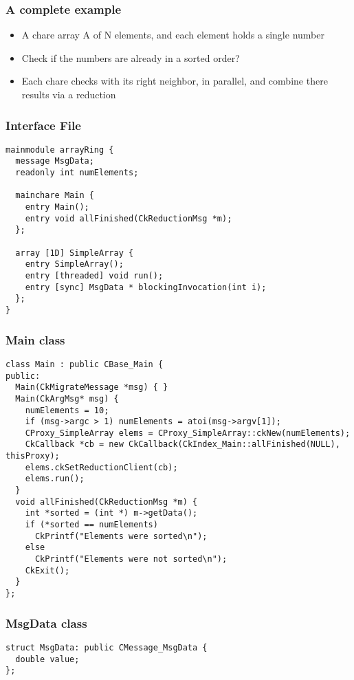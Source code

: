 \begin{frame}[fragile]
\frametitle{A complete example}
\begin{itemize}
\item A chare array A of N elements, and each element holds a single number
\item Check if the numbers are already in a sorted order? 
\item Each chare checks with its right neighbor, in parallel, and combine there
  results via a reduction
\end{itemize}
\end{frame}

\begin{frame}[fragile]
\frametitle{Interface File}
\begin{lstlisting}
mainmodule arrayRing {
  message MsgData;
  readonly int numElements;

  mainchare Main {
    entry Main();
    entry void allFinished(CkReductionMsg *m);
  };

  array [1D] SimpleArray {
    entry SimpleArray();
    entry [threaded] void run();
    entry [sync] MsgData * blockingInvocation(int i);
  };
}
\end{lstlisting}
\end{frame}

\begin{frame}[fragile]
\frametitle{Main class}
\begin{lstlisting}[basicstyle=\scriptsize]
class Main : public CBase_Main {
public:
  Main(CkMigrateMessage *msg) { }
  Main(CkArgMsg* msg) {
    numElements = 10;
    if (msg->argc > 1) numElements = atoi(msg->argv[1]);
    CProxy_SimpleArray elems = CProxy_SimpleArray::ckNew(numElements);
    CkCallback *cb = new CkCallback(CkIndex_Main::allFinished(NULL), thisProxy);
    elems.ckSetReductionClient(cb);
    elems.run();
  } 
  void allFinished(CkReductionMsg *m) {
    int *sorted = (int *) m->getData();
    if (*sorted == numElements)
      CkPrintf("Elements were sorted\n");
    else
      CkPrintf("Elements were not sorted\n");
    CkExit(); 
  }
};
\end{lstlisting}
\end{frame}

\begin{frame}[fragile]
\frametitle{MsgData class}
\begin{lstlisting}
struct MsgData: public CMessage_MsgData { 
  double value;
}; 
\end{lstlisting}
\end{frame}

